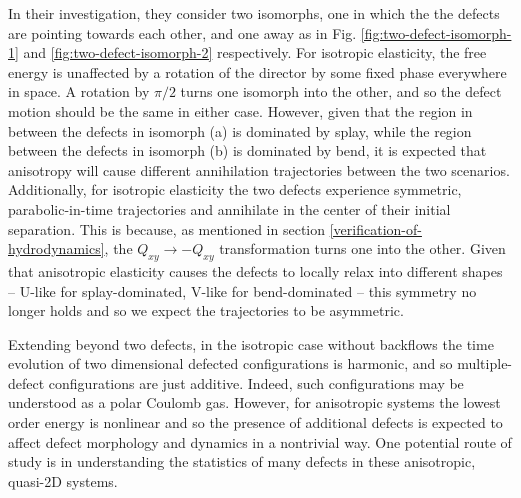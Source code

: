 \documentclass[reqno]{article}
\begin{document}
  In their investigation, they consider two isomorphs, one in which the the
  defects are pointing towards each other, and one away as in Fig.
  \ref{fig:two-defect-isomorph-1} and \ref{fig:two-defect-isomorph-2} respectively.
  For isotropic elasticity, the free energy is unaffected by a rotation of the
  director by some fixed phase everywhere in space.
  A rotation by $\pi / 2$ turns one isomorph into the other, and so the defect
  motion should be the same in either case.
  However, given that the region in between the defects in isomorph (a) is dominated by splay,
  while the region between the defects in isomorph (b) is dominated by bend, it
  is expected that anisotropy will cause different annihilation trajectories
  between the two scenarios.
  Additionally, for isotropic elasticity the two defects experience symmetric,
  parabolic-in-time trajectories and annihilate in the center of their initial
  separation.
  This is because, as mentioned in section \ref{verification-of-hydrodynamics}, the $Q_{xy} \to -Q_{xy}$ transformation
  turns one into the other.
  Given that anisotropic elasticity causes the defects to locally relax into
  different shapes -- U-like for splay-dominated, V-like for bend-dominated --
  this symmetry no longer holds and so we expect the trajectories to be
  asymmetric.

  Extending beyond two defects, in the isotropic case without backflows the
  time evolution of two dimensional defected configurations is harmonic, and so multiple-defect
  configurations are just additive.
  Indeed, such configurations may be understood as a polar Coulomb gas.
  However, for anisotropic systems the lowest order energy is nonlinear and so
  the presence of additional defects is expected to affect defect morphology and
  dynamics in a nontrivial way.
  One potential route of study is in understanding the statistics of many
  defects in these anisotropic, quasi-2D systems.
\end{document}
